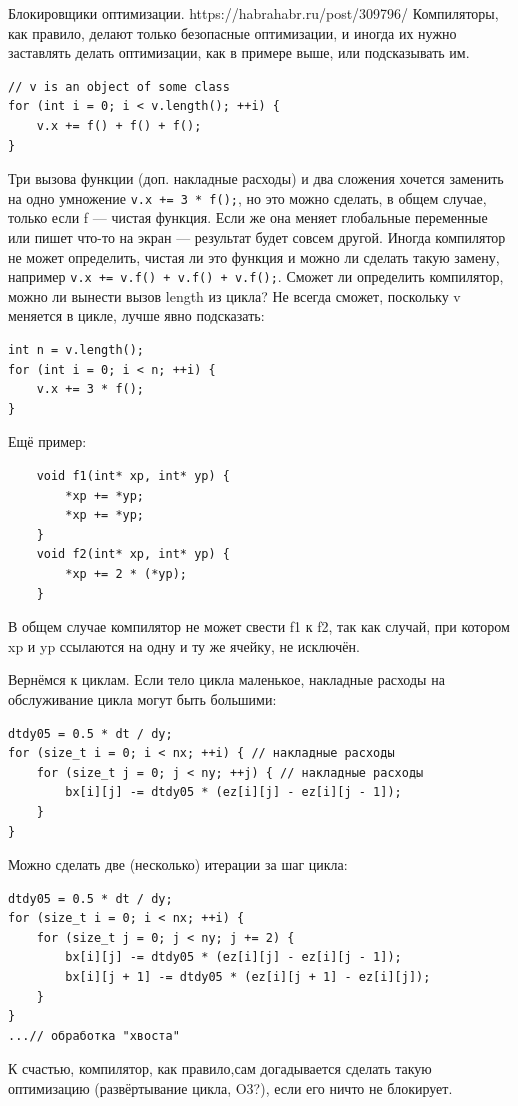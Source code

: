 \documentclass{book}
\begin{document}
Блокировщики оптимизации. https://habrahabr.ru/post/309796/
Компиляторы, как правило, делают только безопасные оптимизации, и иногда их нужно заставлять делать
оптимизации, как в примере выше, или подсказывать им.
\begin{verbatim}
// v is an object of some class
for (int i = 0; i < v.length(); ++i) {
    v.x += f() + f() + f();
}
\end{verbatim}
Три вызова функции (доп. накладные расходы) и два сложения хочется заменить на одно умножение
\texttt{v.x += 3 * f();}, но это можно сделать, в общем случае, только если f --- чистая
функция. Если же она меняет глобальные переменные или пишет что-то на экран --- результат будет
совсем другой. Иногда компилятор не может определить, чистая ли это функция и можно ли сделать
такую замену, например \texttt{v.x += v.f() + v.f() + v.f();}. Сможет ли определить
компилятор, можно ли вынести вызов length из цикла? Не всегда сможет, поскольку v меняется в цикле,
лучше явно подсказать:
\begin{verbatim}
int n = v.length();
for (int i = 0; i < n; ++i) {
    v.x += 3 * f();
}
\end{verbatim}
Ещё пример:
\begin{verbatim}
    void f1(int* xp, int* yp) {
        *xp += *yp;
        *xp += *yp;
    }
    void f2(int* xp, int* yp) {
        *xp += 2 * (*yp);
    }
\end{verbatim}
В общем случае компилятор не может свести f1 к f2, так как случай, при котором xp и yp ссылаются на
одну и ту же ячейку, не исключён.

Вернёмся к циклам. Если тело цикла маленькое, накладные расходы на обслуживание цикла могут быть
большими:
\begin{verbatim}
dtdy05 = 0.5 * dt / dy;
for (size_t i = 0; i < nx; ++i) { // накладные расходы
    for (size_t j = 0; j < ny; ++j) { // накладные расходы
        bx[i][j] -= dtdy05 * (ez[i][j] - ez[i][j - 1]);
    }
}
\end{verbatim}
Можно сделать две (несколько) итерации за шаг цикла:
\begin{verbatim}
dtdy05 = 0.5 * dt / dy;
for (size_t i = 0; i < nx; ++i) {
    for (size_t j = 0; j < ny; j += 2) {
        bx[i][j] -= dtdy05 * (ez[i][j] - ez[i][j - 1]);
        bx[i][j + 1] -= dtdy05 * (ez[i][j + 1] - ez[i][j]);
    }
}
...// обработка "хвоста"
\end{verbatim}
К счастью, компилятор, как правило,сам догадывается сделать такую оптимизацию (развёртывание
цикла, O3?), если его ничто не блокирует.
\end{document}
